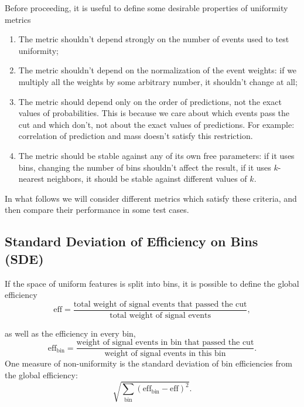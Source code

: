 Before proceeding, it is useful to define some desirable properties of uniformity metrics
\begin{enumerate}
\item
The metric shouldn't depend strongly on the number of events used to test uniformity;
\item
The metric shouldn't depend on the normalization of the event weights: if we multiply all the weights by some arbitrary number, it shouldn't change at all;
\item 
The metric should depend only on the order of predictions, not the exact values of probabilities.
This is because we care about which events pass the cut and which don't, not about the exact values of predictions.
For example: correlation of prediction and mass doesn't satisfy this restriction.
\item
The metric should be stable against any of its own free parameters: if it uses bins, changing the number of bins shouldn't affect the result,
if it uses $k$-nearest neighbors, it should be stable against different values of $k$.
\end{enumerate}
In what follows we will consider different metrics which satisfy these criteria, and then compare their performance in
some test cases.

\subsection{Standard Deviation of Efficiency on Bins (SDE)}

\def\bineff{\text{eff}_\text{bin}}
\def\binweight{\text{weight}_\text{bin}}
\def\globaleff{\text{eff}}
\def\SDE{\text{SDE}}
\def\bin{\text{bin}}

If the space of uniform features is split into bins, it is possible to define the global efficiency
\[
	\globaleff = \dfrac{
		\text{total weight of signal events that passed the cut}}
		{\text{total weight of signal events}},
\]

as well as the efficiency in every bin, 
\[
	\bineff = \dfrac{
		\text{weight of signal events in bin that passed the cut}}
		{\text{weight of signal events in this bin}}.
\]
One measure of non-uniformity is the standard deviation of bin efficiencies from the global efficiency:
\[
	\sqrt{\sum_{\bin} \left( \bineff - \globaleff \right)^2  }.
\]

